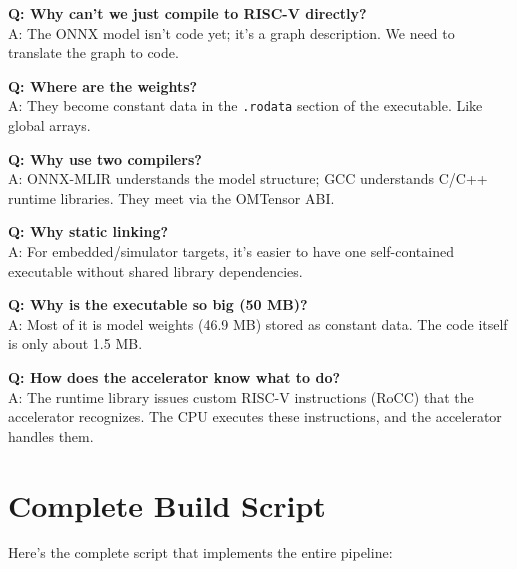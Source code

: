 \documentclass[12pt,a4paper]{article}
\begin{document}
\begin{infoboxenv}
\textbf{Q: Why can't we just compile to RISC-V directly?}\\
A: The ONNX model isn't code yet; it's a graph description. We need to translate the graph to code.

\textbf{Q: Where are the weights?}\\
A: They become constant data in the \texttt{.rodata} section of the executable. Like global arrays.

\textbf{Q: Why use two compilers?}\\
A: ONNX-MLIR understands the model structure; GCC understands C/C++ runtime libraries. They meet via the OMTensor ABI.

\textbf{Q: Why static linking?}\\
A: For embedded/simulator targets, it's easier to have one self-contained executable without shared library dependencies.

\textbf{Q: Why is the executable so big (50 MB)?}\\
A: Most of it is model weights (46.9 MB) stored as constant data. The code itself is only about 1.5 MB.

\textbf{Q: How does the accelerator know what to do?}\\
A: The runtime library issues custom RISC-V instructions (RoCC) that the accelerator recognizes. The CPU executes these instructions, and the accelerator handles them.
\end{infoboxenv}

\section{Complete Build Script}

Here's the complete script that implements the entire pipeline:
\end{document}
